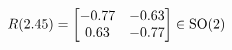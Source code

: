 \documentclass[preview]{standalone}
\begin{document}
\begin{align*}
\special{dvisvgm:raw <g id='unique000'>}R(2.45) = \begin{bmatrix} -0.77 & -0.63 \\ 0.63 & -0.77 \end{bmatrix} \in \text{SO}(2)\special{dvisvgm:raw </g>}
\end{align*}
\end{document}
